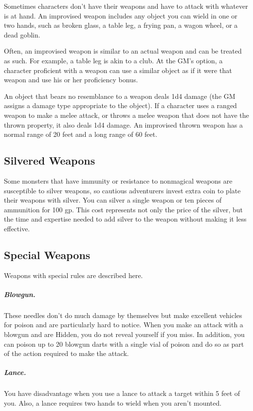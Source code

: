 Sometimes characters don't have their weapons and have to attack with whatever is at hand. An improvised weapon includes any object you can wield in one or two hands, such as broken glass, a table leg, a frying pan, a wagon wheel, or a dead goblin.

Often, an improvised weapon is similar to an actual weapon and can be treated as such. For example, a table leg is akin to a club. At the GM's option, a character proficient with a weapon can use a similar object as if it were that weapon and use his or her proficiency bonus.

An object that bears no resemblance to a weapon deals 1d4 damage (the GM assigns a damage type appropriate to the object). If a character uses a ranged weapon to make a melee attack, or throws a melee weapon that does not have the thrown property, it also deals 1d4 damage. An improvised thrown weapon has a normal range of 20 feet and a long range of 60 feet.

\subsection{Silvered Weapons}

Some monsters that have immunity or resistance to nonmagical weapons are susceptible to silver weapons, so cautious adventurers invest extra coin to plate their weapons with silver. You can silver a single weapon or ten pieces of ammunition for 100 gp. This cost represents not only the price of the silver, but the time and expertise needed to add silver to the weapon without making it less effective.

\subsection{Special Weapons}

Weapons with special rules are described here.

\subparagraph*{Blowgun.} These needles don't do much damage by themselves but make excellent vehicles for poison and are particularly hard to notice. When you make an attack with a blowgun and are Hidden, you do not reveal yourself if you miss. In addition, you can poison up to 20 blowgun darts with a single vial of poison and do so as part of the action required to make the attack.

\subparagraph*{Lance.} You have disadvantage when you use a lance to attack a target within 5 feet of you. Also, a lance requires two hands to wield when you aren't mounted.

